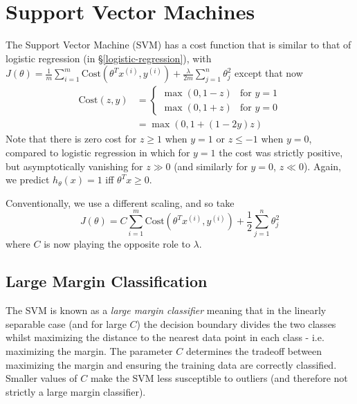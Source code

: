 \documentclass[a4paper,12pt]{article}
\theoremstyle{definition}
\begin{document}
\section{Support Vector Machines}
The Support Vector Machine (SVM) has a cost function that is similar to that of logistic regression (in \S\ref{logistic-regression}), with
$J(\theta) = \frac{1}{m} \sum_{i=1}^{m} \mathrm{Cost}(\theta^T x^{(i)}, y^{(i)}) + \frac{\lambda}{2m} \sum_{j=1}^{n} \theta_j^2$ except that now
\begin{align*}
\mathrm{Cost}(z, y) & = 
\begin{cases}
\max{(0, 1-z)} & \text{for } y = 1 \\
\max{(0, 1+z)} & \text{for } y = 0
\end{cases} \\
& = \max{(0, 1 + (1-2y)z)}
\end{align*}
Note that there is zero cost for $z \ge 1$ when $y = 1$ or $z \le -1$ when $y = 0$, compared to logistic regression in which for $y = 1$ the cost was strictly positive, but asymptotically vanishing for $z \gg 0$ (and similarly for $y = 0$, $z \ll 0$). Again, we predict $h_{\theta}(x) = 1$ iff $\theta^T x \ge 0$.

Conventionally, we use a different scaling, and so take 
\begin{equation}
\label{svm-cost}
J(\theta) = C \sum_{i=1}^{m} \mathrm{Cost}(\theta^T x^{(i)}, y^{(i)}) + \frac{1}{2} \sum_{j=1}^{n} \theta_j^2
\end{equation}
where $C$ is now playing the opposite role to $\lambda$.

\subsection{Large Margin Classification}
The SVM is known as a \emph{large margin classifier} meaning that in the linearly separable case (and for large $C$) the decision boundary divides the two classes whilst maximizing the distance to the nearest data point in each class - i.e. maximizing the margin. The parameter $C$ determines the tradeoff between maximizing the margin and ensuring the training data are correctly classified. Smaller values of $C$ make the SVM less susceptible to outliers (and therefore not strictly a large margin classifier).
\end{document}
